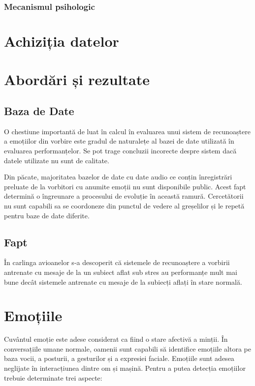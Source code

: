 \documentclass[9pt,shortpaper,twoside,web]{ieeecolor}
\begin{document}
\subsubsection{Mecanismul psihologic}
	
\section{Achiziția datelor}

\section{Abordări și rezultate}


\subsection{Baza de Date}
O chestiune importantă de luat în calcul în evaluarea unui sistem de recunoaștere a emoțiilor din vorbire este gradul de naturalețe al bazei de date utilizată în evaluarea performanțelor. Se pot trage concluzii incorecte despre sistem dacă datele utilizate nu sunt de calitate.

Din păcate, majoritatea bazelor de date cu date audio ce conțin înregistrări preluate de la vorbitori cu anumite emoții nu sunt disponibile public. Acest fapt determină o îngreunare a procesului de evoluție în această ramură. Cercetătorii nu sunt capabili sa se coordoneze din punctul de vedere al greșelilor și le repetă pentru baze de date diferite.


\subsection{Fapt}
În carlinga avioanelor s-a descoperit  că sistemele de recunoaștere a vorbirii antrenate cu mesaje de la un subiect aflat sub stres au performanțe mult mai bune decât sistemele antrenate cu mesaje de la subiecți aflați în stare normală.


\section{Emoțiile}
Cuvântul emoție este adese considerat ca fiind o stare afectivă a minții. În conversațiile umane normale, oamenii sunt capabili să identifice emoțiile altora pe baza vocii, a posturii, a gesturilor și a expresiei faciale. Emoțiile sunt adesea neglijate în interacțiunea dintre om și mașină. Pentru a putea detecția emoțiilor trebuie determinate trei aspecte:
\end{document}
